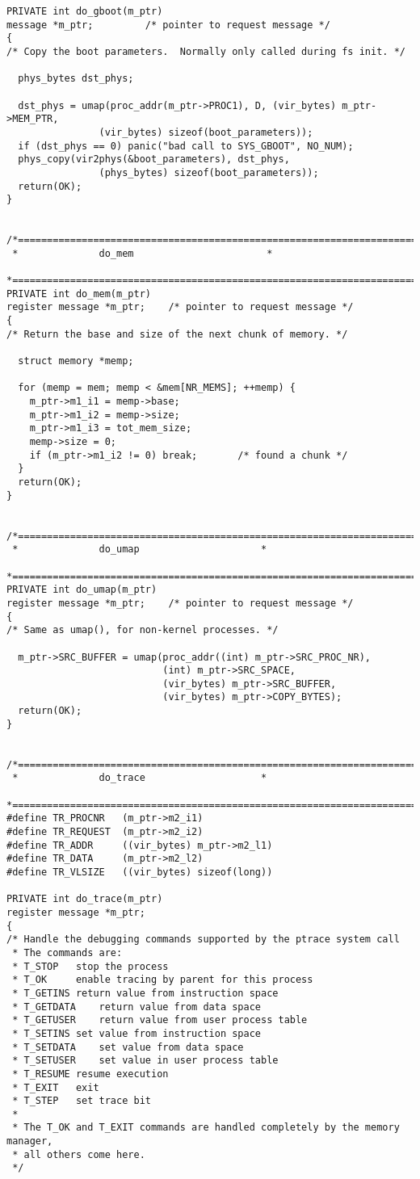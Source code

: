 \begin{verbatim}
PRIVATE int do_gboot(m_ptr)
message *m_ptr;			/* pointer to request message */
{
/* Copy the boot parameters.  Normally only called during fs init. */

  phys_bytes dst_phys;

  dst_phys = umap(proc_addr(m_ptr->PROC1), D, (vir_bytes) m_ptr->MEM_PTR,
				(vir_bytes) sizeof(boot_parameters));
  if (dst_phys == 0) panic("bad call to SYS_GBOOT", NO_NUM);
  phys_copy(vir2phys(&boot_parameters), dst_phys,
				(phys_bytes) sizeof(boot_parameters));
  return(OK);
}


/*===========================================================================*
 *				do_mem					     *
 *===========================================================================*/
PRIVATE int do_mem(m_ptr)
register message *m_ptr;	/* pointer to request message */
{
/* Return the base and size of the next chunk of memory. */

  struct memory *memp;

  for (memp = mem; memp < &mem[NR_MEMS]; ++memp) {
	m_ptr->m1_i1 = memp->base;
	m_ptr->m1_i2 = memp->size;
	m_ptr->m1_i3 = tot_mem_size;
	memp->size = 0;
	if (m_ptr->m1_i2 != 0) break;		/* found a chunk */
  }
  return(OK);
}


/*==========================================================================*
 *				do_umap					    *
 *==========================================================================*/
PRIVATE int do_umap(m_ptr)
register message *m_ptr;	/* pointer to request message */
{
/* Same as umap(), for non-kernel processes. */

  m_ptr->SRC_BUFFER = umap(proc_addr((int) m_ptr->SRC_PROC_NR),
                           (int) m_ptr->SRC_SPACE,
                           (vir_bytes) m_ptr->SRC_BUFFER,
                           (vir_bytes) m_ptr->COPY_BYTES);
  return(OK);
}


/*==========================================================================*
 *				do_trace				    *
 *==========================================================================*/
#define TR_PROCNR	(m_ptr->m2_i1)
#define TR_REQUEST	(m_ptr->m2_i2)
#define TR_ADDR		((vir_bytes) m_ptr->m2_l1)
#define TR_DATA		(m_ptr->m2_l2)
#define TR_VLSIZE	((vir_bytes) sizeof(long))

PRIVATE int do_trace(m_ptr)
register message *m_ptr;
{
/* Handle the debugging commands supported by the ptrace system call
 * The commands are:
 * T_STOP	stop the process
 * T_OK		enable tracing by parent for this process
 * T_GETINS	return value from instruction space
 * T_GETDATA	return value from data space
 * T_GETUSER	return value from user process table
 * T_SETINS	set value from instruction space
 * T_SETDATA	set value from data space
 * T_SETUSER	set value in user process table
 * T_RESUME	resume execution
 * T_EXIT	exit
 * T_STEP	set trace bit
 *
 * The T_OK and T_EXIT commands are handled completely by the memory manager,
 * all others come here.
 */


\end{verbatim}
